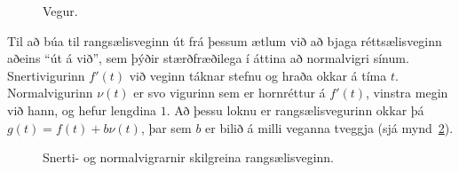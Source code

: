 \documentclass[10pt,a4paper]{amsart}
\begin{document}
\begin{figure}[ht]
	\caption{Vegur.}
	\label{fig2}
\end{figure}

Til að búa til rangsælisveginn út frá þessum ætlum við að bjaga réttsælisveginn
aðeins ``út á við'', sem þýðir stærðfræðilega í áttina að normalvigri sínum.
Snertivigurinn $f'(t)$ við veginn táknar stefnu og hraða okkar á tíma $t$.
Normalvigurinn $\nu(t)$ er svo vigurinn sem er hornréttur á $f'(t)$, vinstra
megin við hann, og hefur lengdina $1$. Að þessu loknu er rangsælisvegurinn
okkar þá $g(t) = f(t) + b \nu(t)$, þar sem $b$ er bilið á milli veganna
tveggja (sjá mynd~\ref{fig3}).

\begin{figure}[hb]
	\caption{Snerti- og normalvigrarnir skilgreina rangsælisveginn.}
	\label{fig3}
\end{figure}
\end{document}
